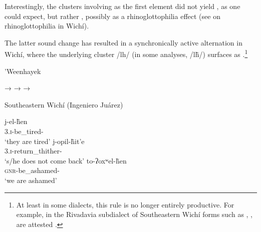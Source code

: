 \begin{exe}
    \ex \plaj
    \ex \distal
    \ex \coal
    \ex \cactus \label{wi-kx-cactus}
    \ex \heavyv
    \ex \youngersis
    \ex \thorncutjan
    \ex \girl
    \ex \powderpl
    \ex \ropepl
    \ex \noseobl
    \ex \sleepiness \label{wi-nx-sleepiness}
    \ex \pathpl
    \ex \orphancwpl
    \ex \up
    \ex \beard \label{wi-px-beard}
    \ex \fishwithhook
    \ex \wildcat
    \ex \bilecwpl
    \ex \uncle
    \ex \throwcw
    \ex \marry
    \ex \healthy
    \ex \rhea \label{wi-nx-rhea}
    \ex \headpl
    \ex \recipient \label{wi-recipient-yh-h}
    \ex \tuscaf
    \ex \tuscat
    \ex \caracarapl
    \ex \doradocw
    \ex \wildbean
    \ex \heartcw \label{wi-th-heart}
\end{exe}

Interestingly, the clusters involving  as the first element did not yield , as one could expect, but rather , possibly as a rhinoglottophilia effect (see  on rhinoglottophilia in Wichí).

\begin{exe}
    \ex \ankle
    \ex \armadillo
    \ex \roast
\end{exe}

The latter sound change has resulted in a synchronically active alternation in Wichí, where the underlying cluster /lh/ (in some analyses, /lh̃/) surfaces as .\footnote{At least in some dialects, this rule is no longer entirely productive. For example, in the Rivadavia subdialect of Southeastern Wichí forms such as , ,  are attested \citep[47]{JT09-th}.}

\ea
'Weenhayek \citep[337–338, 454, 516]{KC16}\\
    \begin{xlist}
        \ex {} → 
        \ex {} → 
        \ex {} → 
    \end{xlist}
\z
{}

\newpage
\ea
Southeastern Wichí (Ingeniero Juárez) \citep[102–103]{LCB-MBC09}\\
    \begin{xlist}
        \ex\gll j-el-h̃en~\\
                3.{\textsc{i}}-be\_tired-\PL\\
                \glt `they are tired'
        \ex\gll j-opil-h̃it’e~\\
                3.{\textsc{i}}-return\_thither-\NEG\\
                \glt `s/he does not come back'
        \ex\gll to-ʔoxʷel-h̃en~\\
                {\textsc{gnr}}-be\_ashamed-\PL\\
                \glt `we are ashamed'
    \end{xlist}
\z

